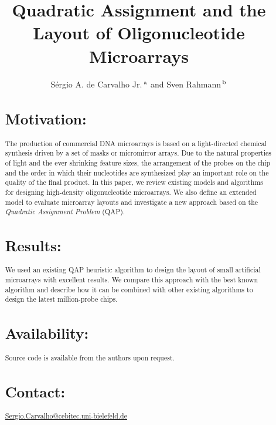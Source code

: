 \documentclass{bioinfo}
\begin{document}

\title[short Title]{Quadratic Assignment and the Layout of Oligonucleotide Microarrays}
\author[Sample \textit{et~al}]{S\'ergio A. de Carvalho Jr.\,$^{\rm a}$ and Sven Rahmann\,$^{\rm b}$}
\address{$^{\rm a}$Graduiertenkolleg Bioinformatik, Bielefeld University, Germany,\\$^{\rm b}$Algorithms and Statistics for Systems Biology, Genome Informatics, Bielefeld University, Germany.}
\maketitle

\begin{abstract}

\section{Motivation:}
The production of commercial DNA microarrays is based on a light-directed chemical synthesis driven by a set of masks or micromirror arrays. Due to the natural properties of light and the ever shrinking feature sizes, the arrangement of the probes on the chip and the order in which their nucleotides are synthesized play an important role on the quality of the final product. In this paper, we review existing models and algorithms for designing high-density oligonucleotide microarrays. We also define an extended model to evaluate microarray layouts and investigate a new approach based on the \emph{Quadratic Assignment Problem} (QAP).
\section{Results:}
We used an existing QAP heuristic algorithm to design the layout of small artificial microarrays with excellent results. We compare this approach with the best known algorithm and describe how it can be combined with other existing algorithms to design the latest million-probe chips.
\section{Availability:}
Source code is available from the authors upon request.
\section{Contact:} \href{Sergio.Carvalho@cebitec.uni-bielefeld.de}{Sergio.Carvalho@cebitec.uni-bielefeld.de}
\end{abstract}
\end{document}
